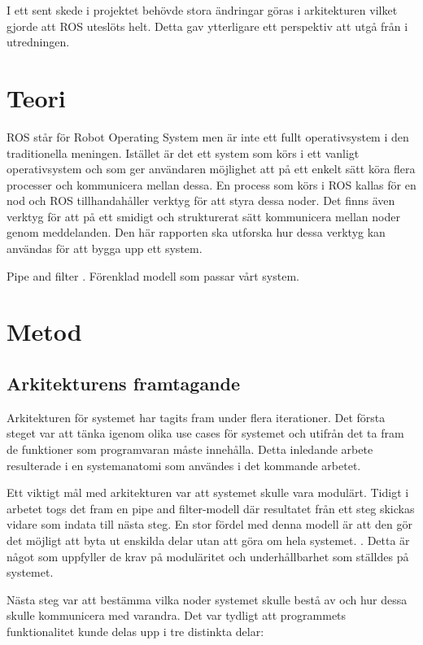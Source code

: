 I ett sent skede i projektet behövde stora ändringar göras i arkitekturen vilket gjorde att ROS uteslöts helt. Detta gav ytterligare ett perspektiv att utgå från i utredningen.

\section{Teori}
\label{sec:theory-lundberg}

ROS står för Robot Operating System men är inte ett fullt operativsystem i den traditionella meningen. Istället är det ett system som körs i ett vanligt operativsystem och som ger användaren möjlighet att på ett enkelt sätt köra flera processer och kommunicera mellan dessa. En process som körs i ROS kallas för en nod och ROS tillhandahåller verktyg för att styra dessa noder. Det finns även verktyg för att på ett smidigt och strukturerat sätt kommunicera mellan noder genom meddelanden. Den här rapporten ska utforska hur dessa verktyg kan användas för att bygga upp ett system. \cite{quigley2009ros}

Pipe and filter \cite{garlan1993introduction}. Förenklad modell som passar vårt system.

\section{Metod}
\label{sec:method-lundberg}

\subsection{Arkitekturens framtagande}
Arkitekturen för systemet har tagits fram under flera iterationer. Det första steget var att tänka igenom olika use cases för systemet och utifrån det ta fram de funktioner som programvaran måste innehålla. Detta inledande arbete resulterade i en systemanatomi som användes i det kommande arbetet.

Ett viktigt mål med arkitekturen var att systemet skulle vara modulärt. Tidigt i arbetet togs det fram en pipe and filter-modell där resultatet från ett steg skickas vidare som indata till nästa steg. En stor fördel med denna modell är att den gör det möjligt att byta ut enskilda delar utan att göra om hela systemet. \cite{garlan1993introduction}. Detta är något som uppfyller de krav på moduläritet och underhållbarhet som ställdes på systemet.

Nästa steg var att bestämma vilka noder systemet skulle bestå av och hur dessa skulle kommunicera med varandra. Det var tydligt att programmets funktionalitet kunde delas upp i tre distinkta delar:


